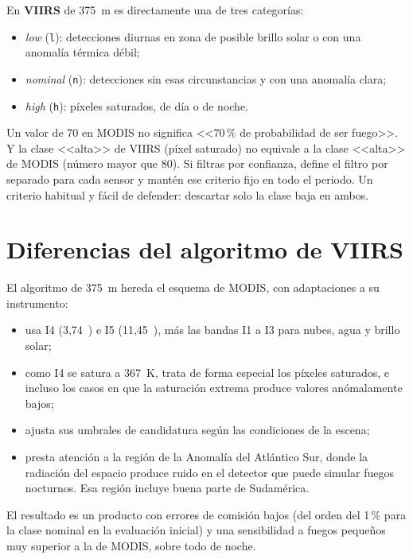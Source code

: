 En \textbf{VIIRS} de 375~m es directamente una de tres categorías:
\begin{itemize}
  \item \emph{low} (\texttt{l}): detecciones diurnas en zona de posible brillo solar o con una
  anomalía térmica débil;
  \item \emph{nominal} (\texttt{n}): detecciones sin esas circunstancias y con una anomalía
  clara;
  \item \emph{high} (\texttt{h}): píxeles saturados, de día o de noche.
\end{itemize}

\begin{atencion}
Un valor de 70 en MODIS no significa <<70\,{}\% de probabilidad de ser fuego>>. Y la clase <<alta>>
de VIIRS (píxel saturado) no equivale a la clase <<alta>> de MODIS (número mayor que 80). Si
filtras por confianza, define el filtro por separado para cada sensor y mantén ese criterio fijo
en todo el periodo. Un criterio habitual y fácil de defender: descartar solo la clase baja en
ambos.
\end{atencion}

\section{Diferencias del algoritmo de VIIRS}

El algoritmo de 375~m hereda el esquema de MODIS, con adaptaciones a su instrumento:

\begin{itemize}
  \item usa I4 (3,74~\um) e I5 (11,45~\um), más las bandas I1 a I3 para nubes, agua y brillo
  solar;
  \item como I4 se satura a 367~K, trata de forma especial los píxeles saturados, e incluso los
  casos en que la saturación extrema produce valores anómalamente bajos;
  \item ajusta sus umbrales de candidatura según las condiciones de la escena;
  \item presta atención a la región de la Anomalía del Atlántico Sur, donde la radiación del
  espacio produce ruido en el detector que puede simular fuegos nocturnos. Esa región incluye
  buena parte de Sudamérica.
\end{itemize}

El resultado es un producto con errores de comisión bajos (del orden del 1\,{}\% para la clase
nominal en la evaluación inicial) y una sensibilidad a fuegos pequeños muy superior a la de
MODIS, sobre todo de noche.

